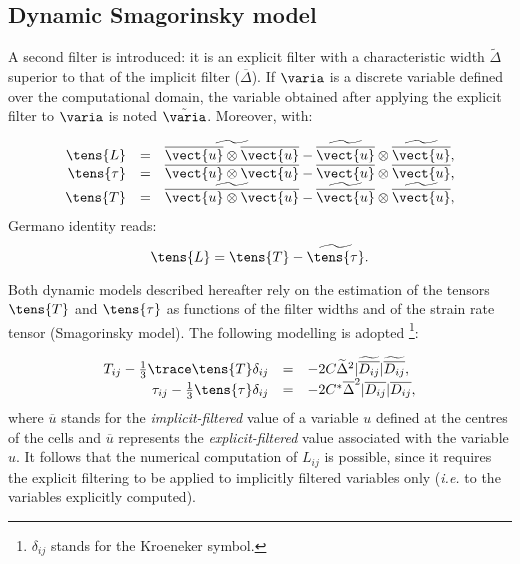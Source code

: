\subsection{Dynamic Smagorinsky model}
A second filter is introduced: it is an explicit filter with a
characteristic width $\widetilde{\Delta }$ superior to that of the implicit
filter ($\overline{\Delta }$). If $\varia$ is a discrete variable defined over
the computational domain, the variable obtained after applying the explicit
filter to $\varia$ is noted $\tilde{\varia}$. Moreover, with:

\begin{equation}
\begin{array}{ r c l}
\tens{L} & = &\widetilde{\overline{\vect{u}} \otimes \overline{\vect{u}}}
-\widetilde{\overline{\vect{u}}} \otimes \widetilde{\overline{ \vect{u}}}, \\
\tens{\tau} & = & \overline{ \vect{u} \otimes \vect{u}}-\overline{\vect{u}} \otimes \overline{ \vect{u}}, \\
\tens{T} &= &\widetilde{\overline{ \vect{u} \otimes \vect{u}}}-\widetilde{\overline{\vect{u}}} \otimes
\widetilde{\overline{ \vect{u}}},
\end{array}
\end{equation}
Germano identity reads:
\begin{equation}
\tens{L} = \tens{T}-\widetilde{\tens{\tau}}.
\end{equation}

Both dynamic models described hereafter rely on the estimation of the tensors
$\tens{T}$ and $\tens{\tau}$ as functions of the filter widths and of the
strain rate tensor (Smagorinsky model). The following modelling is adopted%
\footnote{$\delta_{ij}$ stands for the Kroeneker symbol.}:

\begin{equation}
\begin{array}{ r c l}
T_{ij}-\frac{1}{3}\trace \tens{T} \delta_{ij} &=& -2 C \widetilde{\Delta}^2 |\widetilde{%
\overline{D_{ij}}}| \widetilde{\overline{D_{ij}}}, \\
\tau_{ij}-\frac{1}{3} \tens{\tau } \delta_{ij} &=& -2 C^* \overline{\Delta}^2 |%
\overline{D_{ij}}| \overline{D_{ij}} ,
\end{array}
\end{equation}
where 
$\overline{u}$ stands for the \emph{implicit-filtered} value of a variable $u$
defined at the centres of the cells and $\overline{u}$ represents the
\emph{explicit-filtered} value associated with the variable $u$. It follows that
the numerical computation of $L_{ij}$ is possible, since it requires the
explicit filtering to be applied to implicitly filtered variables only 
(\emph{i.e.} to the variables explicitly computed).


